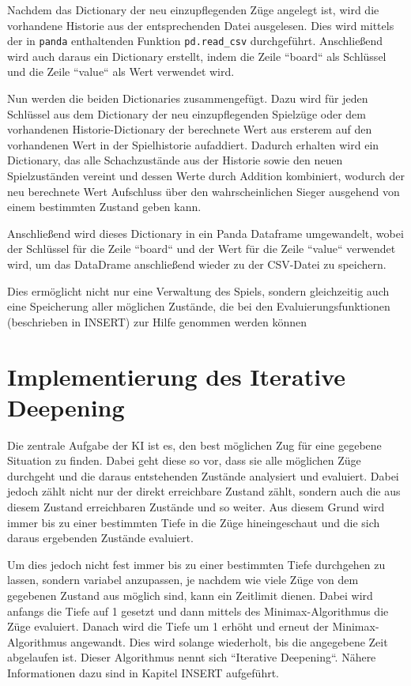 Nachdem das Dictionary der neu einzupflegenden Züge angelegt ist, wird
die vorhandene Historie aus der entsprechenden Datei ausgelesen. Dies
wird mittels der in \texttt{panda} enthaltenden Funktion
\texttt{pd.read\_csv} durchgeführt. Anschließend wird auch daraus ein
Dictionary erstellt, indem die Zeile ``board`` als Schlüssel und die Zeile
``value`` als Wert verwendet wird.

Nun werden die beiden Dictionaries zusammengefügt. Dazu wird für jeden
Schlüssel aus dem Dictionary der neu einzupflegenden Spielzüge oder dem
vorhandenen Historie-Dictionary der berechnete Wert aus ersterem auf den
vorhandenen Wert in der Spielhistorie aufaddiert. Dadurch erhalten wird
ein Dictionary, das alle Schachzustände aus der Historie sowie den neuen
Spielzuständen vereint und dessen Werte durch Addition kombiniert,
wodurch der neu berechnete Wert Aufschluss über den wahrscheinlichen
Sieger ausgehend von einem bestimmten Zustand geben kann.

Anschließend wird dieses Dictionary in ein Panda Dataframe umgewandelt,
wobei der Schlüssel für die Zeile ``board`` und der Wert für die Zeile
``value`` verwendet wird, um das DataDrame anschließend wieder zu der
CSV-Datei zu speichern.

Dies ermöglicht nicht nur eine Verwaltung des Spiels, sondern
gleichzeitig auch eine Speicherung aller möglichen Zustände, die bei den
Evaluierungsfunktionen (beschrieben in INSERT) zur Hilfe genommen werden
können

    \section{Implementierung des Iterative Deepening}\label{implementierung-des-iterative-deepening}

Die zentrale Aufgabe der KI ist es, den best möglichen Zug für eine
gegebene Situation zu finden. Dabei geht diese so vor, dass sie alle
möglichen Züge durchgeht und die daraus entstehenden Zustände analysiert
und evaluiert. Dabei jedoch zählt nicht nur der direkt erreichbare
Zustand zählt, sondern auch die aus diesem Zustand erreichbaren Zustände
und so weiter. Aus diesem Grund wird immer bis zu einer bestimmten Tiefe
in die Züge hineingeschaut und die sich daraus ergebenden Zustände
evaluiert.

Um dies jedoch nicht fest immer bis zu einer bestimmten Tiefe durchgehen
zu lassen, sondern variabel anzupassen, je nachdem wie viele Züge von
dem gegebenen Zustand aus möglich sind, kann ein Zeitlimit dienen. Dabei
wird anfangs die Tiefe auf 1 gesetzt und dann mittels des
Minimax-Algorithmus die Züge evaluiert. Danach wird die Tiefe um 1
erhöht und erneut der Minimax-Algorithmus angewandt. Dies wird solange
wiederholt, bis die angegebene Zeit abgelaufen ist. Dieser Algorithmus
nennt sich ``Iterative Deepening``. Nähere Informationen dazu sind in
Kapitel INSERT aufgeführt.

